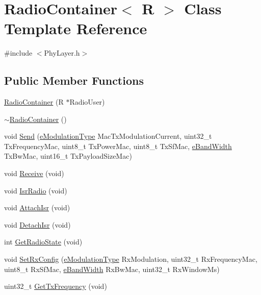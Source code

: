 \hypertarget{class_radio_container}{}\section{Radio\+Container$<$ R $>$ Class Template Reference}
\label{class_radio_container}


{\ttfamily \#include $<$Phy\+Layer.\+h$>$}

\subsection*{Public Member Functions}
\begin{DoxyCompactItemize}
\item 
\mbox{\hyperlink{class_radio_container_acba7b3f419573dc72a58e000072b1d15}{Radio\+Container}} (R $\ast$Radio\+User)
\item 
\mbox{\hyperlink{class_radio_container_af2367ea0e92fa1654a4329d13ed90e47}{$\sim$\+Radio\+Container}} ()
\item 
void \mbox{\hyperlink{class_radio_container_aefcc86fb08cd1857cf6dcd8ba1bd7c90}{Send}} (\mbox{\hyperlink{_define_8h_a81bbaee3ae5a0ec0040b6faedbf80b2f}{e\+Modulation\+Type}} Mac\+Tx\+Modulation\+Current, uint32\+\_\+t Tx\+Frequency\+Mac, uint8\+\_\+t Tx\+Power\+Mac, uint8\+\_\+t Tx\+Sf\+Mac, \mbox{\hyperlink{_define_8h_a6cbb491180e131f374cdbe63880c85e1}{e\+Band\+Width}} Tx\+Bw\+Mac, uint16\+\_\+t Tx\+Payload\+Size\+Mac)
\item 
void \mbox{\hyperlink{class_radio_container_a9a7e676f1735ea1f67898d6e3014ded1}{Receive}} (void)
\item 
void \mbox{\hyperlink{class_radio_container_a4ea6769301a5aaa8e33e22562e024619}{Isr\+Radio}} (void)
\item 
void \mbox{\hyperlink{class_radio_container_ab4ae2d79a43dca2bdf0900cc2e3aac5c}{Attach\+Isr}} (void)
\item 
void \mbox{\hyperlink{class_radio_container_a8819af2363c07fc158989c57a45e5e48}{Detach\+Isr}} (void)
\item 
int \mbox{\hyperlink{class_radio_container_a3ffe014538d877752663a6f747247554}{Get\+Radio\+State}} (void)
\item 
void \mbox{\hyperlink{class_radio_container_a2ca1eae7a18c37aefa507b59ad1bcbef}{Set\+Rx\+Config}} (\mbox{\hyperlink{_define_8h_a81bbaee3ae5a0ec0040b6faedbf80b2f}{e\+Modulation\+Type}} Rx\+Modulation, uint32\+\_\+t Rx\+Frequency\+Mac, uint8\+\_\+t Rx\+Sf\+Mac, \mbox{\hyperlink{_define_8h_a6cbb491180e131f374cdbe63880c85e1}{e\+Band\+Width}} Rx\+Bw\+Mac, uint32\+\_\+t Rx\+Window\+Ms)
\item 
uint32\+\_\+t \mbox{\hyperlink{class_radio_container_a59cf65c721a176fdd0cf2d0039a18242}{Get\+Tx\+Frequency}} (void)
\end{DoxyCompactItemize}
